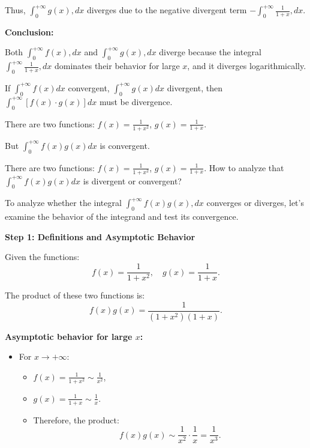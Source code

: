 \documentclass[a4paper,12pt]{book}
\begin{document}
Thus, \( \int_0^{+\infty} g(x) , dx \) diverges due to the negative divergent term \( -\int_0^{+\infty} \frac{1}{1+x} , dx \).

\hrulefill

\textbf{Conclusion:}

Both \( \int_0^{+\infty} f(x) , dx \) and \( \int_0^{+\infty} g(x) , dx \) diverge because the integral \( \int_0^{+\infty} \frac{1}{1+x} , dx \) dominates their behavior for large \( x \), and it diverges logarithmically.

\hrulefill

If \( \int_0^{+\infty} f(x) dx\) convergent, \( \int_0^{+\infty} g(x) dx\) divergent, then \( \int_0^{+\infty} \left[ f(x)\cdot g(x) \right] dx\) must be divergence.

There are two functions: \( f(x)=\frac{1}{1+x^2} \), \(g(x)=\frac{1}{1+x} \).

But \( \int_0^{+\infty} f(x)g(x) dx \) is convergent.

There are two functions: \( f(x)=\frac{1}{1+x^2} \), \(g(x)=\frac{1}{1+x} \). How to analyze that \( \int_0^{+\infty} f(x)g(x) dx \) is divergent or convergent?

To analyze whether the integral \( \int_0^{+\infty} f(x)g(x) , dx \) converges or diverges, let's examine the behavior of the integrand and test its convergence.

\hrulefill

\textbf{Step 1: Definitions and Asymptotic Behavior}

Given the functions:
\[
f(x) = \frac{1}{1+x^2}, \quad g(x) = \frac{1}{1+x}.
\]

The product of these two functions is:
\[
f(x)g(x) = \frac{1}{(1+x^2)(1+x)}.
\]

\textbf{Asymptotic behavior for large \( x \):}
\begin{itemize}
\item 
For \( x \to +\infty \):
\begin{itemize}
\item 
\( f(x) = \frac{1}{1+x^2} \sim \frac{1}{x^2} \),

\item 
\( g(x) = \frac{1}{1+x} \sim \frac{1}{x} \).

\item 
Therefore, the product:
\[
f(x)g(x) \sim \frac{1}{x^2} \cdot \frac{1}{x} = \frac{1}{x^3}.
\]

\end{itemize}

\end{itemize}
\end{document}

